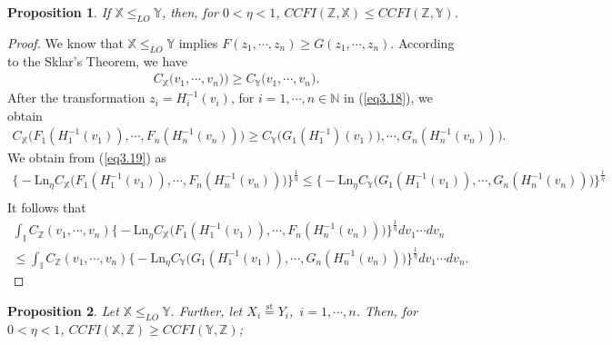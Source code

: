 \documentclass[12pt, a4paper]{article}
\numberwithin{equation}{section}
\newtheorem{proposition}{Proposition}[section]
\begin{document}
\begin{proposition}\label{prop3.4}
If $\mathbb{X}\le_{LO}\mathbb{Y}$, then, for $0<\eta<1$, $CCFI(\mathbb{Z},\mathbb{X})\le CCFI(\mathbb{Z},\mathbb{Y})$.
\end{proposition}
\begin{proof}
We know that $\mathbb{X}\le_{LO}\mathbb{Y}$ implies $F(z_1,\cdots,z_n)\ge G(z_1,\cdots,z_n).$ According to the Sklar's Theorem, we have
\begin{align}\label{eq3.18}
C_\mathbb{X}\big(v_1,\cdots, v_n)\big)\ge C_\mathbb{Y}\big(v_1,\cdots, v_n\big).
\end{align}
After the transformation $z_i=H^{-1}_i(v_i)$, for $i=1,\cdots,n\in\mathbb{N}$ in (\ref{eq3.18}), we obtain
\begin{align}\label{eq3.19}
C_\mathbb{X}\big(F_1(H_1^{-1}(v_1)),\cdots, F_n(H_n^{-1}(v_n))\big)\ge C_\mathbb{Y}\big(G_1(H_1^{-1})(v_1)),\cdots, G_n(H_n^{-1}(v_n))\big).
\end{align}
 We obtain from (\ref{eq3.19}) as 
\begin{align*}
\Big\{-\mathrm{Ln}_\eta C_\mathbb{X}\big(F_1(H^{-1}_1(v_1)),\cdots, F_n(H^{-1}_n(v_n))\big)\Big\}^{{\frac{1}{\eta}}}\le \Big\{-\mathrm{Ln}_\eta C_\mathbb{Y}\big(G_1(H^{-1}_1(v_1)),\cdots, G_n(H^{-1}_n(v_n))\big)\Big\}^{\frac{1}{\eta}}\\
\end{align*}
It follows that 
\begin{align*}
	 \int_{\mathbb I}C_\mathbb{Z}(v_1,\cdots,v_n)\Big\{-\mathrm{Ln}_\eta C_\mathbb{X}\big(F_1(H^{-1}_1(v_1)),\cdots, F_n(H^{-1}_n(v_n))\big)\Big\}^{{\frac{1}{\eta}}}dv_1\cdots dv_n\\
	\le \int_{\mathbb I}C_\mathbb{Z}(v_1,\cdots,v_n)\Big\{-\mathrm{Ln}_\eta C_\mathbb{Y}\big(G_1(H^{-1}_1(v_1)),\cdots, G_n(H^{-1}_n(v_n))\big)\Big\}^{{\frac{1}{\eta}}}dv_1\cdots dv_n.
\end{align*}
\end{proof}
\begin{proposition}\label{prop3.5}
Let $\mathbb{X}\le_{LO}\mathbb{Y}$. Further, let $X_i\overset{\mathrm{st}}{=}Y_i$,~$i=1,\cdots,n$. Then,
 for $0<\eta<1$, $CCFI(\mathbb{X},\mathbb{Z})\ge CCFI(\mathbb{Y},\mathbb{Z})$;
\end{proposition}
\end{document}
